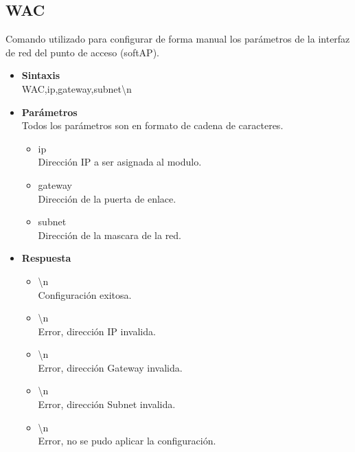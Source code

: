 \documentclass[a4paper,spanish]{article}
\begin{document}
\subsection{WAC}
Comando utilizado para configurar de forma manual los parámetros de la interfaz de red del punto de acceso (softAP). 
\begin{itemize}
	\item \textbf{Sintaxis}\\
	{\ttfamily WAC,ip,gateway,subnet\textbackslash n}
	\item \textbf{Parámetros}\\
	Todos los parámetros son en formato de cadena de caracteres. 
	\begin{itemize}
		\item{\ttfamily ip}\\
		Dirección IP a ser asignada al modulo. 
		\item{\ttfamily gateway}\\
		Dirección de la puerta de enlace.
		\item{\ttfamily subnet}\\
		Dirección de la mascara de la red.
	\end{itemize}
	\item \textbf{Respuesta}
	\begin{itemize}
		\item{\textbackslash n} \\
		Configuración exitosa.
		\item{\textbackslash n} \\
		Error, dirección IP invalida.
		\item{\textbackslash n} \\
		Error, dirección Gateway invalida.
		\item{\textbackslash n} \\
		Error, dirección Subnet invalida. 
		\item{\textbackslash n} \\
		Error, no se pudo aplicar la configuración.
	\end{itemize}
\end{itemize}
\end{document}
